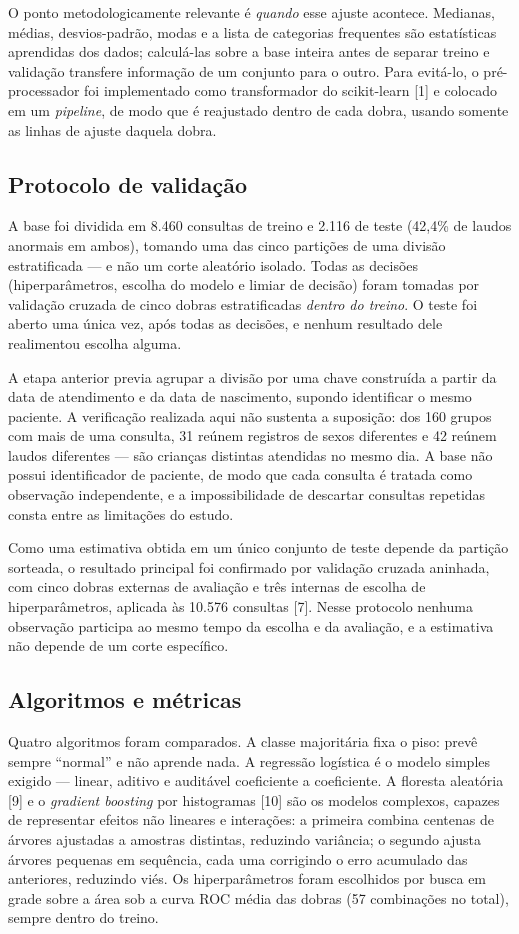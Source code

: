 \documentclass[conference]{IEEEtran}
\begin{document}
O ponto metodologicamente relevante é \textit{quando} esse ajuste acontece. Medianas, médias, desvios-padrão, modas e a lista de categorias frequentes são estatísticas aprendidas dos dados; calculá-las sobre a base inteira antes de separar treino e validação transfere informação de um conjunto para o outro. Para evitá-lo, o pré-processador foi implementado como transformador do scikit-learn [1] e colocado em um \textit{pipeline}, de modo que é reajustado dentro de cada dobra, usando somente as linhas de ajuste daquela dobra.

\subsection{Protocolo de validação}
A base foi dividida em 8.460 consultas de treino e 2.116 de teste (42,4\% de laudos anormais em ambos), tomando uma das cinco partições de uma divisão estratificada --- e não um corte aleatório isolado. Todas as decisões (hiperparâmetros, escolha do modelo e limiar de decisão) foram tomadas por validação cruzada de cinco dobras estratificadas \textit{dentro do treino}. O teste foi aberto uma única vez, após todas as decisões, e nenhum resultado dele realimentou escolha alguma.

A etapa anterior previa agrupar a divisão por uma chave construída a partir da data de atendimento e da data de nascimento, supondo identificar o mesmo paciente. A verificação realizada aqui não sustenta a suposição: dos 160 grupos com mais de uma consulta, 31 reúnem registros de sexos diferentes e 42 reúnem laudos diferentes --- são crianças distintas atendidas no mesmo dia. A base não possui identificador de paciente, de modo que cada consulta é tratada como observação independente, e a impossibilidade de descartar consultas repetidas consta entre as limitações do estudo.

Como uma estimativa obtida em um único conjunto de teste depende da partição sorteada, o resultado principal foi confirmado por validação cruzada aninhada, com cinco dobras externas de avaliação e três internas de escolha de hiperparâmetros, aplicada às 10.576 consultas [7]. Nesse protocolo nenhuma observação participa ao mesmo tempo da escolha e da avaliação, e a estimativa não depende de um corte específico.

\subsection{Algoritmos e métricas}
Quatro algoritmos foram comparados. A classe majoritária fixa o piso: prevê sempre ``normal'' e não aprende nada. A regressão logística é o modelo simples exigido --- linear, aditivo e auditável coeficiente a coeficiente. A floresta aleatória [9] e o \textit{gradient boosting} por histogramas [10] são os modelos complexos, capazes de representar efeitos não lineares e interações: a primeira combina centenas de árvores ajustadas a amostras distintas, reduzindo variância; o segundo ajusta árvores pequenas em sequência, cada uma corrigindo o erro acumulado das anteriores, reduzindo viés. Os hiperparâmetros foram escolhidos por busca em grade sobre a área sob a curva ROC média das dobras (57 combinações no total), sempre dentro do treino.
\end{document}
